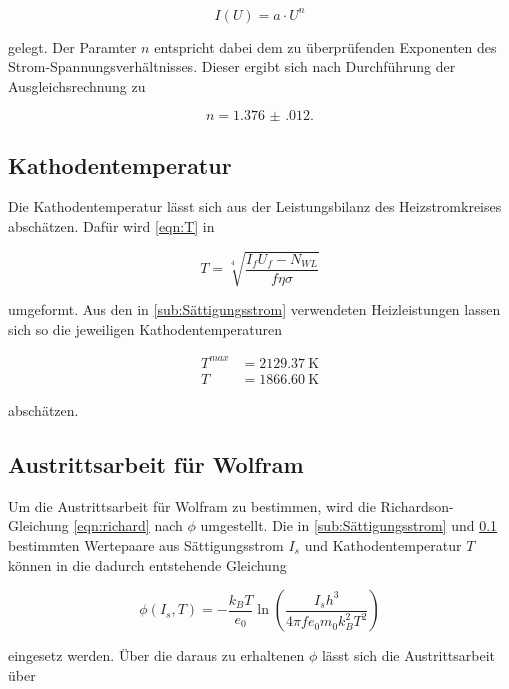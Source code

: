 \begin{equation}
    I(U)=a\cdot U^n
\end{equation}

gelegt. 
Der Paramter $n$ entspricht dabei dem zu überprüfenden Exponenten des Strom-Spannungsverhältnisses.
Dieser ergibt sich nach Durchführung der Ausgleichsrechnung zu 

\begin{equation*}
    n=\num{1.376(012)}.
\end{equation*}



\subsection{Kathodentemperatur}
\label{sub:Kathodentemperatur}

Die Kathodentemperatur lässt sich aus der Leistungsbilanz des Heizstromkreises abschätzen. Dafür wird \eqref{eqn:T} in

\begin{equation}
    T=\sqrt[4]{\frac{I_fU_f-N_{WL}}{f\eta \sigma}}
\end{equation}

umgeformt. Aus den in \ref{sub:Sättigungsstrom} verwendeten Heizleistungen lassen sich so die jeweiligen Kathodentemperaturen

\begin{align*}
T^{max}&=\SI{2129.37}{\kelvin} \\
T&=\SI{1866.60}{\kelvin}
\end{align*}

abschätzen.


\subsection{Austrittsarbeit für Wolfram}

Um die Austrittsarbeit für Wolfram zu bestimmen, wird die Richardson-Gleichung \eqref{eqn:richard} nach $\phi$ umgestellt.
Die in \ref{sub:Sättigungsstrom} und  \ref{sub:Kathodentemperatur} bestimmten Wertepaare aus Sättigungsstrom $I_s$ und Kathodentemperatur $T$ können in die dadurch entstehende Gleichung

\begin{equation}
    \phi(I_s,T)=-\frac{k_BT}{e_0}\ln\left(\frac{I_sh^3}{4\pi f e_0 m_0 k_B^2 T^2}\right)
\end{equation} 

eingesetz werden. Über die daraus zu erhaltenen $\phi$ lässt sich die Austrittsarbeit über

